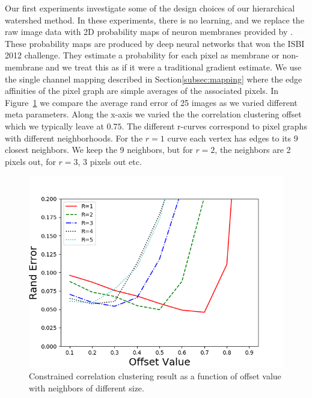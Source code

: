 \documentclass[letterpaper,twocolumn,fleqn]{article}
\begin{document}
Our first experiments investigate some of the design choices of our hierarchical watershed method. In these experiments, there is no learning, and we replace the raw image data with 2D probability maps of neuron membranes provided by \cite{ciresan2012deep}. These probability maps are produced by deep neural networks that won the ISBI 2012 challenge. They estimate a probability for each pixel as membrane or non-membrane and we treat this as if it were a traditional gradient estimate. We use the single channel mapping described in Section\ref{subsec:mapping} where the edge affinities of the pixel graph are simple averages of the associated pixels. In Figure~\ref{fig:offset_radius} we compare the average rand error of 25 images as we varied different meta parameters. Along the x-axis we varied the the correlation clustering offset which we typically leave at $0.75$. The different r-curves correspond to pixel graphs with different neighborhoods. For the $r=1$ curve each vertex has edges to its 9 closest neighbors. We keep the 9 neighbors, but for $r=2$, the neighbors are 2 pixels out, for $r=3$, 3 pixels out etc.  
 
\begin{figure}[h]
    \centering
    \includegraphics[height = 0.3\textheight]{offset_errors_verse_radius.png}
    \caption{Constrained correlation clustering result as a function of offset value with neighbors of different size. }
    \label{fig:offset_radius}
\end{figure}
\end{document}
